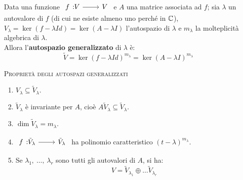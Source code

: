 \begin{define}
Data una funzione $\funz{f}{V}{V}$ e $A$ una matrice associata ad $f$; sia $\lambda$ un autovalore di $f$ (di cui ne esiste almeno uno perché in $\mathbb{C}$), $V_{\lambda}=\ker \left(f-\lambda Id\right)=\ker \left(A-\lambda I\right)$ l'autospazio di $\lambda$ e $m_{\lambda}$ la molteplicità algebrica di $\lambda$.\\
Allora l'\textbf{autospazio generalizzato} di $\lambda$ è:
\begin{equation}
	\tilde{V}=\ker\left(f-\lambda Id\right)^{m_{\lambda}}=\ker\left(A-\lambda I\right)^{m_{\lambda}}
\end{equation}
\end{define}
\begin{lemming}\textsc{Proprietà degli autospazi generalizzati}
	\begin{enumerate}
		\item $V_\lambda\subseteq \tilde{V}_{\lambda}$.
		\item $\tilde{V}_{\lambda}$ è invariante per $A$, cioè $A\tilde{V}_{\lambda}\subseteq \tilde{V}_{\lambda}$.
		\item $\dim \tilde{V}_{\lambda}=m_{\lambda}$.
		\item $\funz{f}{\tilde{V}_{\lambda}}{\tilde{V}_{\lambda}}$ ha polinomio caratteristico $\left(t-\lambda\right)^{m_{\lambda}}$.
		\item Se $\lambda_1,\ \ldots,\ \lambda_r$ sono tutti gli autovalori di $A$, si ha:
		\begin{equation}
			V=\tilde{V}_{\lambda_1}\oplus\dots\tilde{V}_{\lambda_r}
		\end{equation}
	\end{enumerate}
\vspace{-6mm}
\end{lemming}

